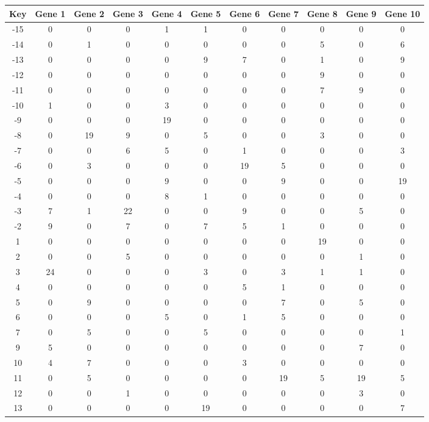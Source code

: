 \begin{tabular}{|c|c|c|c|c|c|c|c|c|c|c|}
\hline
Key & Gene 1 & Gene 2 & Gene 3 & Gene 4 & Gene 5 & Gene 6 & Gene 7 & Gene 8 & Gene 9 & Gene 10 \\
\hline
-15 & 0 & 0 & 0 & 1 & 1 & 0 & 0 & 0 & 0 & 0 \\
-14 & 0 & 1 & 0 & 0 & 0 & 0 & 0 & 5 & 0 & 6 \\
-13 & 0 & 0 & 0 & 0 & 9 & 7 & 0 & 1 & 0 & 9 \\
-12 & 0 & 0 & 0 & 0 & 0 & 0 & 0 & 9 & 0 & 0 \\
-11 & 0 & 0 & 0 & 0 & 0 & 0 & 0 & 7 & 9 & 0 \\
-10 & 1 & 0 & 0 & 3 & 0 & 0 & 0 & 0 & 0 & 0 \\
-9 & 0 & 0 & 0 & 19 & 0 & 0 & 0 & 0 & 0 & 0 \\
-8 & 0 & 19 & 9 & 0 & 5 & 0 & 0 & 3 & 0 & 0 \\
-7 & 0 & 0 & 6 & 5 & 0 & 1 & 0 & 0 & 0 & 3 \\
-6 & 0 & 3 & 0 & 0 & 0 & 19 & 5 & 0 & 0 & 0 \\
-5 & 0 & 0 & 0 & 9 & 0 & 0 & 9 & 0 & 0 & 19 \\
-4 & 0 & 0 & 0 & 8 & 1 & 0 & 0 & 0 & 0 & 0 \\
-3 & 7 & 1 & 22 & 0 & 0 & 9 & 0 & 0 & 5 & 0 \\
-2 & 9 & 0 & 7 & 0 & 7 & 5 & 1 & 0 & 0 & 0 \\
1 & 0 & 0 & 0 & 0 & 0 & 0 & 0 & 19 & 0 & 0 \\
2 & 0 & 0 & 5 & 0 & 0 & 0 & 0 & 0 & 1 & 0 \\
3 & 24 & 0 & 0 & 0 & 3 & 0 & 3 & 1 & 1 & 0 \\
4 & 0 & 0 & 0 & 0 & 0 & 5 & 1 & 0 & 0 & 0 \\
5 & 0 & 9 & 0 & 0 & 0 & 0 & 7 & 0 & 5 & 0 \\
6 & 0 & 0 & 0 & 5 & 0 & 1 & 5 & 0 & 0 & 0 \\
7 & 0 & 5 & 0 & 0 & 5 & 0 & 0 & 0 & 0 & 1 \\
9 & 5 & 0 & 0 & 0 & 0 & 0 & 0 & 0 & 7 & 0 \\
10 & 4 & 7 & 0 & 0 & 0 & 3 & 0 & 0 & 0 & 0 \\
11 & 0 & 5 & 0 & 0 & 0 & 0 & 19 & 5 & 19 & 5 \\
12 & 0 & 0 & 1 & 0 & 0 & 0 & 0 & 0 & 3 & 0 \\
13 & 0 & 0 & 0 & 0 & 19 & 0 & 0 & 0 & 0 & 7 \\
\hline
\end{tabular}
